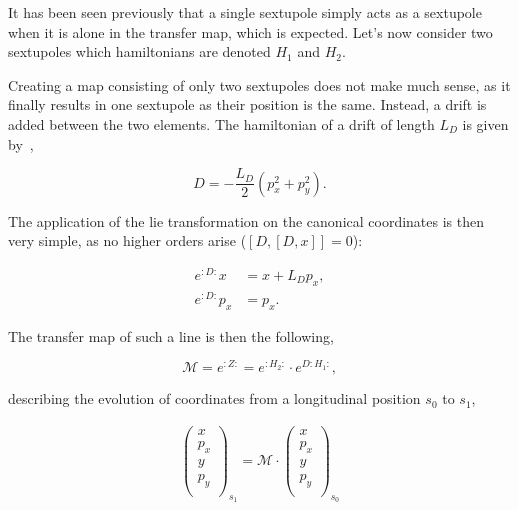 It has been seen previously that a single sextupole simply acts as a sextupole when it is alone in the transfer
map, which is expected. Let's now consider two sextupoles which hamiltonians are denoted $H_{1}$ and
$H_{2}$.

Creating a map consisting of only two sextupoles does not make much sense, as it finally results in
one sextupole as their position is the same. Instead, a drift is added between the two elements.
The hamiltonian of a drift of length $L_D$ is given by~\cite{herr_mathematical_2018},

\begin{equation}
    D = -\frac{L_D}{2} (p_x^2 + p_y^2).
\end{equation}

The application of the lie transformation on the canonical coordinates is then very simple, as no
higher orders arise ($[D, [D, x]] = 0$):

\begin{equation}
    \begin{aligned}
        e^{:D:} x   &= x + L_D p_x, \\
        e^{:D:} p_x &= p_x.
    \end{aligned}
\end{equation}

The transfer map of such a line is then the following,

\begin{equation}
    \mathcal{M} = e^{:Z:} = e^{:H_{2}:} \cdot e^{D:H_{1}:},
\end{equation}

describing the evolution of coordinates from a longitudinal position $s_0$ to $s_1$,

\begin{equation}
    \begin{aligned}
        \begin{pmatrix}
            x \\
            p_x \\
            y \\
            p_y \\
        \end{pmatrix}_{s_1}
        =
        \mathcal{M} \cdot
        \begin{pmatrix}
            x \\
            p_x \\
            y \\
            p_y \\
        \end{pmatrix}_{s_0}
    \end{aligned}
    \label{eq:coordinate_systems:transformation_coords_sextupole}
\end{equation}

